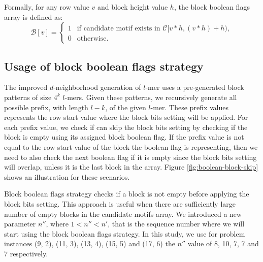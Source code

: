 Formally, for any row value $v$ and block height value $h$, the block boolean flags array is defined as:
\begin{equation}
	\mathcal{B}[v] = \left\{
		\begin{array}{rl}
			1 & \text{if candidate motif exists in } \mathcal{C}[v * h, (v * h) + h), \\
			0 & \text{otherwise.}
		\end{array} \right. 
\end{equation}



\subsection{Usage of block boolean flags strategy}

The improved $d$-neighborhood generation of $l$-mer uses a pre-generated block patterns of size $4^k$ $l$-mers. Given these patterns, we recursively generate all possible prefix, with length $l - k$, of the given $l$-mer. These prefix values represents the row start value where the block bits setting will be applied. For each prefix value, we check if can skip the block bits setting by checking if the block is empty using its assigned block boolean flag. If the prefix value is not equal to the row start value of the block the boolean flag is representing, then we need to also check the next boolean flag if it is empty since the block bits setting will overlap, unless it is the last block in the array. Figure \ref{fig:boolean-block-skip} shows an illustration for these scenarios.




Block boolean flags strategy checks if a block is not empty before applying the block bits setting. This approach is useful when there are sufficiently large number of empty blocks in the candidate motifs array. We introduced a new parameter $n''$, where $1 < n'' < n'$, that is the sequence number where we will start using the block boolean flags strategy. In this study, we use for problem instances (9, 2), (11, 3), (13, 4), (15, 5) and (17, 6) the $n''$ value of 8, 10, 7, 7 and 7 respectively.



